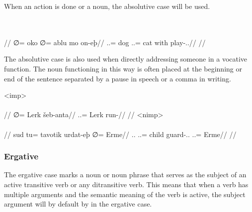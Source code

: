When an action is done  or  a noun, the absolutive case will be used.

	\begingl
		\glpreamble{}\\
		\\
		//
		\gla ∅= oko ∅= ablu mo on-eþ//
		\glb \An.\Sg.\Abs= dog \An.\Sg.\Abs= cat with play-\Ind.\Npst.\Prg//
		\glft{}//
	\endgl
\xe

The absolutive case is also used when directly addressing someone in a vocative function. The noun functioning in this way is often placed at the beginning or end of the sentence separated by a pause in speech or a comma in writing.

	\a<imp>\begingl
		\glpreamble{}\\
		\\
		//
		\gla ∅= Lerk šeb-anta//
		\glb \An.\Sg.\Abs= Lerk run-\Imp//
		\glft{}//
	\endgl
	\a<nimp>\begingl
		\glpreamble{}\\
		\\
		//
		\gla sud tu= tavotik urdat-eþ ∅= Erme//
		\glb \Tps.\An.\Erg{} \An.\Sg.\Acc= child guard-\Ind.\Npst.\Prg{} \An.\Sg.\Abs= Erme//
		\glft{}//
	\endgl
\xe

\subsubsection{Ergative}
\label{subsubsec:tvk-nouns-ergative}

The ergative case marks a noun or noun phrase that serves as the subject of an active transitive verb or any ditransitive verb. This means that when a verb has multiple arguments and the semantic meaning of the verb is active, the subject argument will by default by in the ergative case.

